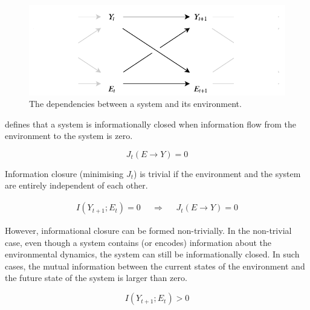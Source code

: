 \documentclass[utf8]{article}
\begin{document}
            
				\begin{figure}
					\includegraphics[width=\textwidth]{WritingMaterials/Fig_SystemAndEnv/SystemAndEnv_2.pdf}
					\caption{The dependencies between a system and its environment.} %
					\label{fig:SystemAndEnv}
				\end{figure}


			\noindent
			\cite{BERTSCHINGER.2006} defines that a system is informationally closed when information flow from the environment to the system is zero.

				\begin{equation}
				J_{t}(E \rightarrow Y )=0
				\label{eq:informationflow2}
				\end{equation}


			\noindent
			Information closure (minimising $J_t$) is trivial if the environment and the system are entirely independent of each other.

				\begin{equation}
				\begin{aligned}
				{I(Y_{t+1};E_{t})=0}&&{\Rightarrow}&&{J_{t}(E \rightarrow Y )=0}
				\end{aligned}
				\end{equation}


			\noindent
			However, informational closure can be formed non-trivially. In the non-trivial case, even though a system contains (or encodes) information about the environmental dynamics, the system can still be informationally closed. In such cases, the mutual information between the current states of the environment and the future state of the system is larger than zero. %

				\begin{equation}
				I(Y_{t+1};E_{t}) > 0
				\end{equation}
\end{document}
